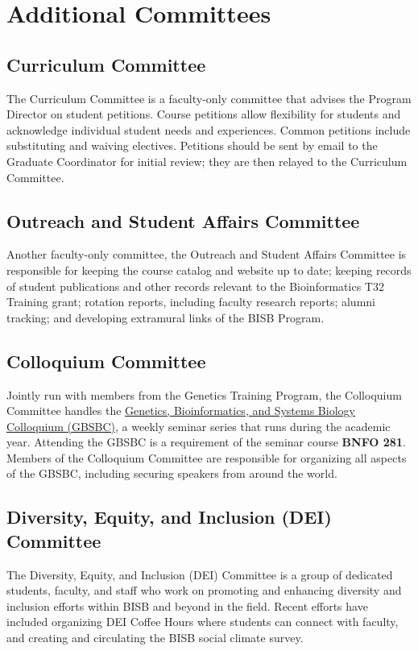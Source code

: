 \section{Additional Committees}

\subsection{Curriculum Committee}
The Curriculum Committee is a faculty-only committee that advises the Program Director on student petitions. Course petitions allow flexibility for students and acknowledge individual student needs and experiences. Common petitions include substituting and waiving electives. Petitions should be sent by email to the Graduate Coordinator for initial review; they are then relayed to the Curriculum Committee.

\subsection{Outreach and Student Affairs Committee}
Another faculty-only committee, the Outreach and Student Affairs Committee is responsible for keeping the course catalog and website up to date; keeping records of student publications and other records relevant to the Bioinformatics T32 Training grant; rotation reports, including faculty research reports; alumni tracking; and developing extramural links of the BISB Program.

\subsection{Colloquium Committee}
Jointly run with members from the Genetics Training Program, the Colloquium Committee handles the \href{http://genomic.weebly.com/}{Genetics, Bioinformatics, and Systems Biology Colloquium (GBSBC)}, a weekly seminar series that runs during the academic year. Attending the GBSBC is a requirement of the seminar course \textbf{BNFO 281}. Members of the Colloquium Committee are responsible for organizing all aspects of the GBSBC, including securing speakers from around the world.

\subsection{Diversity, Equity, and Inclusion (DEI) Committee}
The Diversity, Equity, and Inclusion (DEI) Committee is a group of dedicated students, faculty, and staff who work on promoting and enhancing diversity and inclusion efforts within BISB and beyond in the field. Recent efforts have included organizing DEI Coffee Hours where students can connect with faculty, and creating and circulating the BISB social climate survey.

